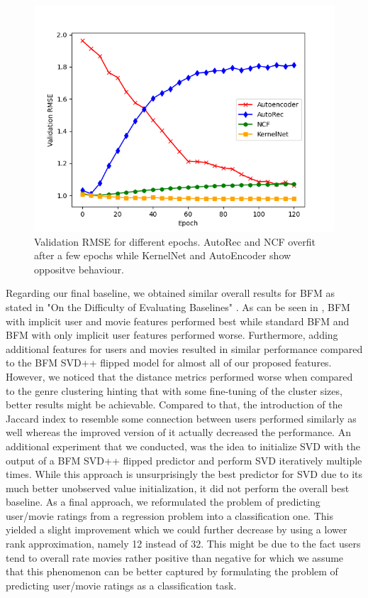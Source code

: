 \documentclass[10pt,conference,compsocconf]{IEEEtran}
\begin{document}
    \begin{figure}
        \includegraphics[width=\columnwidth]{figures/validation_plot.png}
        \caption{Validation RMSE for different epochs.
        AutoRec and NCF overfit after a few epochs while KernelNet and AutoEncoder show oppositve behaviour.}
        \label{fig:validation}
    \end{figure}


    Regarding our final baseline, we obtained similar overall results for BFM as stated in "On the Difficulty of Evaluating Baselines" \cite{rendle_difficulty_2019}.
    As can be seen in , BFM with implicit user and movie features performed best while standard BFM and BFM with only implicit user features performed worse.
    Furthermore, adding additional features for users and movies resulted in similar performance compared to the BFM SVD++ flipped model for almost all of our proposed features.
    However, we noticed that the distance metrics performed worse when compared to the genre clustering hinting that with some fine-tuning of the cluster sizes, better results might be achievable.
    Compared to that, the introduction of the Jaccard index to resemble some connection between users performed similarly as well whereas the improved version of it actually decreased the performance.
    An additional experiment that we conducted, was the idea to initialize SVD with the output of a BFM SVD++ flipped predictor and perform SVD iteratively multiple times.
    While this approach is unsurprisingly the best predictor for SVD due to its much better unobserved value initialization, it did not perform the overall best baseline.
    As a final approach, we reformulated the problem of predicting user/movie ratings from a regression problem into a classification one.
    This yielded a slight improvement which we could further decrease by using a lower rank approximation, namely 12 instead of 32.
    This might be due to the fact users tend to overall rate movies rather positive than negative for which we assume that this phenomenon can be better captured by formulating the problem of predicting user/movie ratings as a classification task.
\end{document}
